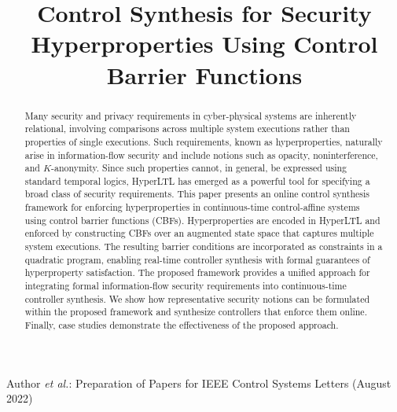 \documentclass[journal,twoside,web]{ieeecolor}
\begin{document}
\def\BibTeX{{\rm B\kern-.05em{\sc i\kern-.025em b}\kern-.08em
    T\kern-.1667em\lower.7ex\hbox{E}\kern-.125emX}}
{Author \MakeLowercase{\textit{et al.}}: Preparation of Papers for IEEE Control Systems Letters (August 2022)}


\title{Control Synthesis for Security Hyperproperties Using Control Barrier Functions}



\maketitle
\thispagestyle{empty}
 

\begin{abstract}
    Many security and privacy requirements in cyber-physical systems are inherently relational, involving comparisons across multiple system executions rather than properties of single executions. Such requirements, known as hyperproperties, naturally arise in information-flow security and include notions such as opacity, noninterference, and $K$-anonymity. Since such properties cannot, in general, be expressed using standard temporal logics, HyperLTL has emerged as a powerful tool for specifying a broad class of security requirements.
    This paper presents an online control synthesis framework for enforcing hyperproperties in continuous-time control-affine systems using control barrier functions (CBFs). Hyperproperties are encoded in HyperLTL and enforced by constructing CBFs over an augmented state space that captures multiple system executions. The resulting barrier conditions are incorporated as constraints in a quadratic program, enabling real-time controller synthesis with formal guarantees of hyperproperty satisfaction. 
    The proposed framework provides a unified approach for integrating formal information-flow security requirements into continuous-time controller synthesis. We show how representative security notions can be formulated within the proposed framework and synthesize controllers that enforce them online. Finally, case studies demonstrate the effectiveness of the proposed approach.
\end{abstract}
\end{document}

